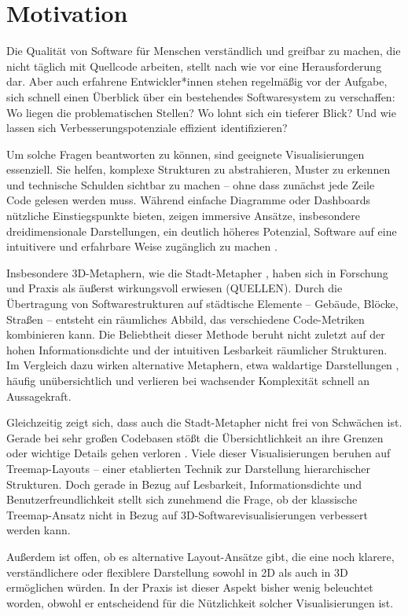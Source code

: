 \section{Motivation} \label{sec:Motivation}
Die Qualität von Software für Menschen verständlich und greifbar zu machen, die nicht täglich mit Quellcode arbeiten, stellt nach wie vor eine Herausforderung dar. Aber auch erfahrene Entwickler*innen stehen regelmäßig vor der Aufgabe, sich schnell einen Überblick über ein bestehendes Softwaresystem zu verschaffen: Wo liegen die problematischen Stellen? Wo lohnt sich ein tieferer Blick? Und wie lassen sich Verbesserungspotenziale effizient identifizieren?

Um solche Fragen beantworten zu können, sind geeignete Visualisierungen essenziell. Sie helfen, komplexe Strukturen zu abstrahieren, Muster zu erkennen und technische Schulden sichtbar zu machen – ohne dass zunächst jede Zeile Code gelesen werden muss. Während einfache Diagramme oder Dashboards nützliche Einstiegspunkte bieten, zeigen immersive Ansätze, insbesondere dreidimensionale Darstellungen, ein deutlich höheres Potenzial, Software auf eine intuitivere und erfahrbare Weise zugänglich zu machen \cite{3dsoftwareMarcus,codeCity1,first_3D_vis,virtualButVisibleMunro}.

Insbesondere 3D-Metaphern, wie die Stadt-Metapher \cite{codeCity1}, haben sich in Forschung und Praxis als äußerst wirkungsvoll erwiesen (QUELLEN). Durch die Übertragung von Softwarestrukturen auf städtische Elemente – Gebäude, Blöcke, Straßen – entsteht ein räumliches Abbild, das verschiedene Code-Metriken kombinieren kann. Die Beliebtheit dieser Methode beruht nicht zuletzt auf der hohen Informationsdichte und der intuitiven Lesbarkeit räumlicher Strukturen. Im Vergleich dazu wirken alternative Metaphern, etwa waldartige Darstellungen \cite{softwareForest}, häufig unübersichtlich und verlieren bei wachsender Komplexität schnell an Aussagekraft.

Gleichzeitig zeigt sich, dass auch die Stadt-Metapher nicht frei von Schwächen ist. Gerade bei sehr großen Codebasen stößt die Übersichtlichkeit an ihre Grenzen oder wichtige Details gehen verloren \cite{lu2008cascaded}. Viele dieser Visualisierungen beruhen auf Treemap-Layouts – einer etablierten Technik zur Darstellung hierarchischer Strukturen. Doch gerade in Bezug auf Lesbarkeit, Informationsdichte und Benutzerfreundlichkeit stellt sich zunehmend die Frage, ob der klassische Treemap-Ansatz nicht in Bezug auf 3D-Softwarevisualisierungen verbessert werden kann.

Außerdem ist offen, ob es alternative Layout-Ansätze gibt, die eine noch klarere, verständlichere oder flexiblere Darstellung sowohl in 2D als auch in 3D ermöglichen würden. In der Praxis ist dieser Aspekt bisher wenig beleuchtet worden, obwohl er entscheidend für die Nützlichkeit solcher Visualisierungen ist.

